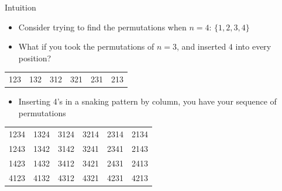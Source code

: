 \documentclass[aspectratio=169]{beamer}
\begin{document}
\begin{frame}{Intuition}
\begin{itemize}
    \item Consider trying to find the permutations when $n=4$: $\{1,2,3,4\}$ \pause
    \item What if you took the permutations of $n=3$, and inserted $4$ into every position? \pause
\end{itemize}
\begin{table}[]
\begin{tabular}{llllll}
123 & 132 & 312 & 321 & 231 & 213 \pause \\
\end{tabular}
\end{table}
\begin{itemize}
    \item Inserting \textcolor{sigma@mainblue}{4}'s in a snaking pattern by column, you have your sequence of permutations
\end{itemize}
\begin{table}[]
\begin{tabular}{llllll}
123\textcolor{sigma@mainblue}{4} & 132\textcolor{sigma@mainblue}{4} & 312\textcolor{sigma@mainblue}{4} & 321\textcolor{sigma@mainblue}{4} & 231\textcolor{sigma@mainblue}{4} & 213\textcolor{sigma@mainblue}{4} \pause \\
12\textcolor{sigma@mainblue}{4}3 & 13\textcolor{sigma@mainblue}{4}2 & 31\textcolor{sigma@mainblue}{4}2 & 32\textcolor{sigma@mainblue}{4}1 & 23\textcolor{sigma@mainblue}{4}1 & 21\textcolor{sigma@mainblue}{4}3 \pause \\
1\textcolor{sigma@mainblue}{4}23 & 1\textcolor{sigma@mainblue}{4}32 & 3\textcolor{sigma@mainblue}{4}12 & 3\textcolor{sigma@mainblue}{4}21 & 2\textcolor{sigma@mainblue}{4}31 & 2\textcolor{sigma@mainblue}{4}13 \\
\textcolor{sigma@mainblue}{4}123 & \textcolor{sigma@mainblue}{4}132 & \textcolor{sigma@mainblue}{4}312 & \textcolor{sigma@mainblue}{4}321 & \textcolor{sigma@mainblue}{4}231 & \textcolor{sigma@mainblue}{4}213
\end{tabular}
\end{table}
\end{frame}
\end{document}

